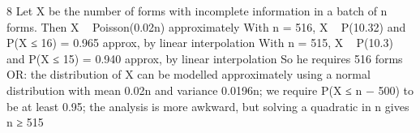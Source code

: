 \documentclass[a4paper,12pt]{article}
\begin{document}
8 Let X be the number of forms with incomplete information in a batch of n forms.
Then X ~ Poisson(0.02n) approximately
With n = 516, X ~ P(10.32) and P(X ≤ 16) = 0.965 approx, by linear interpolation
With n = 515, X ~ P(10.3) and P(X ≤ 15) = 0.940 approx, by linear interpolation
So he requires 516 forms
OR: the distribution of X can be modelled approximately using a normal distribution
with mean 0.02n and variance 0.0196n; we require P(X ≤ n − 500) to be at least 0.95;
the analysis is more awkward, but solving a quadratic in n gives n ≥ 515
\end{document}
